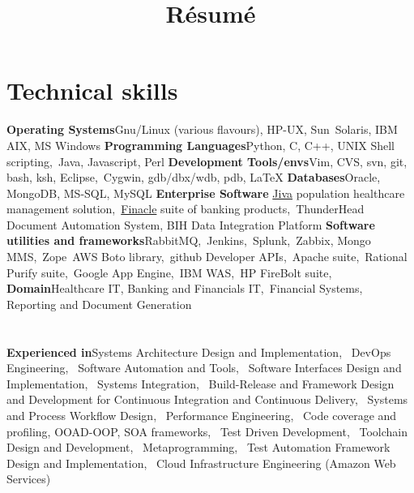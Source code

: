 \documentclass[11pt,a4paper,sans]{moderncv}
\title{Résumé}
\begin{document}
\maketitle

\newcommand\colorhref[3][linky]{\href{#2}{\small\color{#1}#3}}


\section{Technical skills}
\cvcomputer
{\textbf{Operating Systems}}{Gnu/Linux (various flavours), HP-UX, Sun\
	Solaris, IBM AIX, MS Windows}
{\textbf{Programming Languages}}{Python, C, C++, UNIX Shell scripting,\
	Java, Javascript, Perl}
\cvcomputer
{\textbf{Development Tools/envs}}{Vim, CVS, svn, git, bash, ksh, Eclipse,\
Cygwin, gdb/dbx/wdb, pdb, \textrm{\LaTeX}}
{\textbf{Databases}}{Oracle, MongoDB, MS-SQL, MySQL}
\cvcomputer
{\textbf{Enterprise Software}}{
	\hypersetup{linkcolor=blue}\colorhref{http://www.zeomega.com/what-we-provide/jiva/}{Jiva} population healthcare management solution,\
	\hypersetup{linkcolor=blue}\colorhref{finacle.com}{Finacle} suite of banking products,\ 
		ThunderHead Document Automation System, BIH Data Integration Platform
}
{\textbf{Software utilities and frameworks}}{RabbitMQ,\
	Jenkins,\
	Splunk,\
	Zabbix,
	Mongo MMS,\
	Zope\,
	AWS Boto library,\
	github Developer APIs,\
	Apache suite,\
	Rational Purify suite,\
	Google App Engine,\
	IBM WAS,\
	HP FireBolt suite,\
}
{}{}
\cvcomputer
{\textbf{Domain}}{Healthcare IT, Banking and Financials IT,\
	Financial Systems, Reporting and Document Generation}
{}{}
\section{}
\cvline
{\textbf{Experienced in}}{Systems Architecture Design and Implementation, \
	DevOps Engineering, \
	Software Automation and Tools, \
	Software Interfaces Design and Implementation, \
	Systems Integration, \
	Build-Release and Framework Design and Development for Continuous Integration and Continuous Delivery, \
	Systems and Process Workflow Design, \
	Performance Engineering, \
	Code coverage and profiling, OOAD-OOP, SOA frameworks, \
	Test Driven Development, \
	Toolchain Design and Development, \
	Metaprogramming, \
	Test Automation Framework Design and Implementation, \
	Cloud Infrastructure Engineering (Amazon Web Services) \
	}
\end{document}
